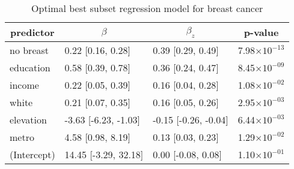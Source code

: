 \begin{table}[!tbp]
\caption{Optimal best subset regression model for breast cancer\label{SI_tab:breast}} 
\begin{center}
\begin{tabular}{llll}
\hline\hline
\multicolumn{1}{c}{predictor}&\multicolumn{1}{c}{$\beta$}&\multicolumn{1}{c}{$\beta_z$}&\multicolumn{1}{c}{p-value}\tabularnewline
\hline
no breast&0.22 [0.16, 0.28]&0.39 [0.29, 0.49]&7.98$\times10^{-13}$\tabularnewline
education&0.58 [0.39, 0.78]&0.36 [0.24, 0.47]&8.45$\times10^{-09}$\tabularnewline
income&0.22 [0.05, 0.39]&0.16 [0.04, 0.28]&1.08$\times10^{-02}$\tabularnewline
white&0.21 [0.07, 0.35]&0.16 [0.05, 0.26]&2.95$\times10^{-03}$\tabularnewline
elevation&-3.63 [-6.23, -1.03]&-0.15 [-0.26, -0.04]&6.44$\times10^{-03}$\tabularnewline
metro&4.58 [0.98, 8.19]&0.13 [0.03, 0.23]&1.29$\times10^{-02}$\tabularnewline
(Intercept)&14.45 [-3.29, 32.18]&0.00 [-0.08, 0.08]&1.10$\times10^{-01}$\tabularnewline
\hline
\end{tabular}\end{center}

\end{table}
